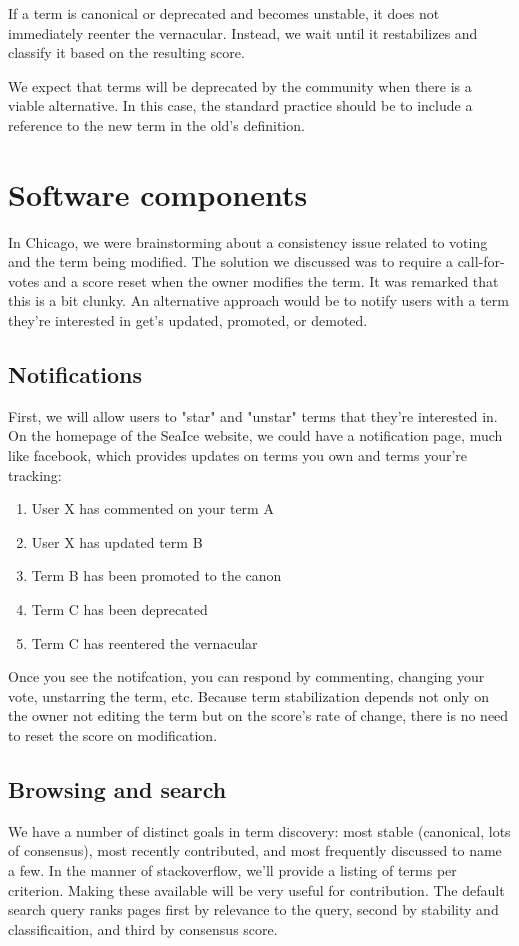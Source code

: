 \documentclass[letter]{article}
\begin{document}
If a term is canonical or deprecated and becomes unstable, it does not immediately reenter the vernacular. 
Instead, we wait until it restabilizes and classify it based on the resulting score. 

We expect that terms will be deprecated by the community when there is a viable alternative. In this case, 
the standard practice should be to include a reference to the new term in the old's definition. 


\section{Software components}
In Chicago, we were brainstorming about a consistency issue related to voting and the term being 
modified. The solution we discussed was to require a call-for-votes and a score reset when the 
owner modifies the term. It was remarked that this is a bit clunky. An alternative approach would be
to notify users with a term they're interested in get's updated, promoted, or demoted. 

\subsection{Notifications}
First, we will allow users to "star" and "unstar" terms that they're interested in. 
On the homepage of the SeaIce website, we could have a notification page, much like facebook, which 
provides updates on terms you own and terms your're tracking:
\begin{enumerate}
  \item User X has commented on your term A
  \item User X has updated term B 
  \item Term B has been promoted to the canon
  \item Term C has been deprecated
  \item Term C has reentered the vernacular
\end{enumerate}

Once you see the notifcation, you can respond by commenting, changing your vote, unstarring the term,
etc. Because term stabilization depends not only on the owner not editing the term but on the score's
rate of change, there is no need to reset the score on modification. 

\subsection{Browsing and search}
We have a number of distinct goals in term discovery: most stable (canonical, lots of consensus), 
most recently contributed, and most frequently discussed to name a few. In the manner of stackoverflow, 
we'll provide a listing of terms per criterion. Making these available will be very useful for  contribution. 
The default search query ranks pages first by 
relevance to the query, second by stability and classificaition, and third by consensus score. 
\end{document}
